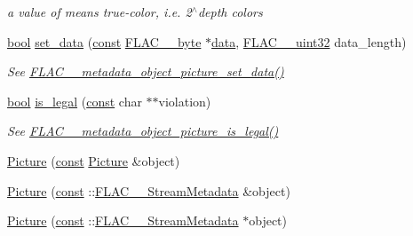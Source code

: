 \begin{DoxyCompactItemize}
\begin{DoxyCompactList}\small\item\em a value of {} means true-\/color, i.\+e. 2$^\wedge$depth colors \end{DoxyCompactList}\item 
\hyperlink{mac_2config_2i386_2lib-src_2libsoxr_2soxr-config_8h_abb452686968e48b67397da5f97445f5b}{bool} \hyperlink{class_f_l_a_c_1_1_metadata_1_1_picture_a301630d1c8f7647d0f192e6a2a03e6ba}{set\+\_\+data} (\hyperlink{getopt1_8c_a2c212835823e3c54a8ab6d95c652660e}{const} \hyperlink{ordinals_8h_a5eb569b12d5b047cdacada4d57924ee3}{F\+L\+A\+C\+\_\+\+\_\+byte} $\ast$\hyperlink{lib_2expat_8h_ac39e72a1de1cb50dbdc54b08d0432a24}{data}, \hyperlink{ordinals_8h_a9c4005ea7ef8d564b0cc993cdd0e4e5e}{F\+L\+A\+C\+\_\+\+\_\+uint32} data\+\_\+length)
\begin{DoxyCompactList}\small\item\em See \hyperlink{group__flac__metadata__object_ga07e5950094528e2954c06d7991d543a8}{F\+L\+A\+C\+\_\+\+\_\+metadata\+\_\+object\+\_\+picture\+\_\+set\+\_\+data()} \end{DoxyCompactList}\item 
\hyperlink{mac_2config_2i386_2lib-src_2libsoxr_2soxr-config_8h_abb452686968e48b67397da5f97445f5b}{bool} \hyperlink{class_f_l_a_c_1_1_metadata_1_1_picture_af11147e2041b46d679b077e6ac26bea0}{is\+\_\+legal} (\hyperlink{getopt1_8c_a2c212835823e3c54a8ab6d95c652660e}{const} char $\ast$$\ast$violation)
\begin{DoxyCompactList}\small\item\em See \hyperlink{group__flac__metadata__object_ga2e389272f4df904e1652e79c89ca55c8}{F\+L\+A\+C\+\_\+\+\_\+metadata\+\_\+object\+\_\+picture\+\_\+is\+\_\+legal()} \end{DoxyCompactList}\end{DoxyCompactItemize}
{\bf }\par
\begin{DoxyCompactItemize}
\item 
\hyperlink{class_f_l_a_c_1_1_metadata_1_1_picture_a368985afb060fe1024129ed808392183}{Picture} (\hyperlink{getopt1_8c_a2c212835823e3c54a8ab6d95c652660e}{const} \hyperlink{class_f_l_a_c_1_1_metadata_1_1_picture}{Picture} \&object)
\item 
\hyperlink{class_f_l_a_c_1_1_metadata_1_1_picture_a447a5837baeb1e5de9e7ae642a15e736}{Picture} (\hyperlink{getopt1_8c_a2c212835823e3c54a8ab6d95c652660e}{const} \+::\hyperlink{struct_f_l_a_c_____stream_metadata}{F\+L\+A\+C\+\_\+\+\_\+\+Stream\+Metadata} \&object)
\item 
\hyperlink{class_f_l_a_c_1_1_metadata_1_1_picture_a5403f0a99ef43e17c43a4ec21c275c83}{Picture} (\hyperlink{getopt1_8c_a2c212835823e3c54a8ab6d95c652660e}{const} \+::\hyperlink{struct_f_l_a_c_____stream_metadata}{F\+L\+A\+C\+\_\+\+\_\+\+Stream\+Metadata} $\ast$object)
\end{DoxyCompactItemize}


